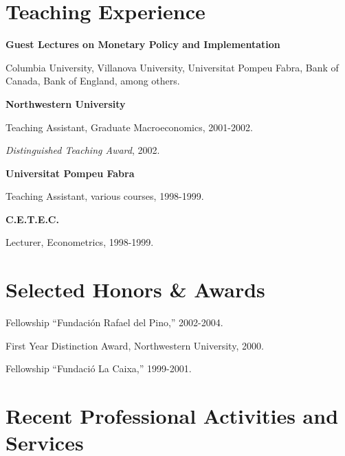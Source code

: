 \documentclass[letterpaper, 12pt]{article}
\renewenvironment{itemize}{
  \begin{list}{}{
    \setlength{\leftmargin}{2em}
  }
}{
  \end{list}
}
\begin{document}
\section*{Teaching Experience}

\begin{itemize}
  \item {\bf Guest Lectures on Monetary Policy and Implementation}
  \begin{itemize}
    \item Columbia University, Villanova University, Universitat Pompeu Fabra, Bank of Canada, Bank of England, among others.
  \end{itemize} 
  \item {\bf Northwestern University}
  \begin{itemize}
    \item Teaching Assistant, Graduate Macroeconomics, 2001-2002.
    \item \textit{Distinguished Teaching Award}, 2002.
  \end{itemize}
  \item {\bf Universitat Pompeu Fabra}
  \begin{itemize}
    \item Teaching Assistant, various courses, 1998-1999.
  \end{itemize}
  \item {\bf C.E.T.E.C.}
  \begin{itemize}
    \item Lecturer, Econometrics, 1998-1999.
  \end{itemize}
\end{itemize}

\section*{Selected Honors \& Awards}

\begin{itemize}
  \item Fellowship ``Fundaci\'on Rafael del Pino,'' 2002-2004.
  \item First Year Distinction Award, Northwestern University, 2000.
  \item Fellowship ``Fundaci\'o La Caixa,'' 1999-2001.
\end{itemize}

\section*{Recent Professional Activities and Services}
\end{document}
